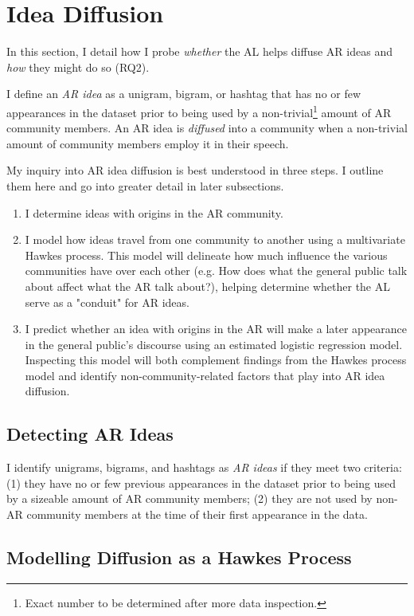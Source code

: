 \documentclass[acmlarge, screen, authorversion]{acmart}
\begin{document}
\section{Idea Diffusion}

In this section, I detail how I probe \textit{whether} the AL helps diffuse AR ideas and \textit{how} they might do so (RQ2). 

I define an \textit{AR idea} as a unigram, bigram, or hashtag that has no or few appearances in the dataset prior to being used by a non-trivial\footnote{Exact number to be determined after more data inspection.} amount of AR community members. An AR idea is \textit{diffused} into a community when a non-trivial amount of community members employ it in their speech.

My inquiry into AR idea diffusion is best understood in three steps. I outline them here and go into greater detail in later subsections.

\begin{enumerate}
    \item I determine ideas with origins in the AR community.
    \item I model how ideas travel from one community to another using a multivariate Hawkes process. This model will delineate how much influence the various communities have over each other (e.g. How does what the general public talk about affect what the AR talk about?), helping determine whether the AL serve as a "conduit" for AR ideas.
    \item I predict whether an idea with origins in the AR will make a later appearance in the general public's discourse using an estimated logistic regression model. Inspecting this model will both complement findings from the Hawkes process model and identify non-community-related factors that play into AR idea diffusion.
\end{enumerate}

\subsection{Detecting AR Ideas}

I identify unigrams, bigrams, and hashtags as \textit{AR ideas} if they meet two criteria: (1) they have no or few previous appearances in the dataset prior to being used by a sizeable amount of AR community members; (2) they are not used by non-AR community members at the time of their first appearance in the data.

\subsection{Modelling Diffusion as a Hawkes Process}
\end{document}
